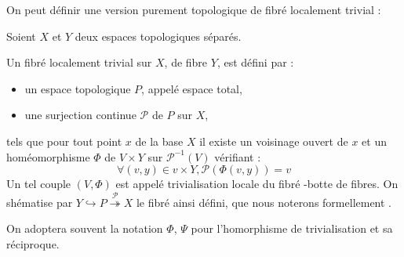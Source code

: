 On peut d\'efinir une version purement topologique de fibr\'e localement trivial :

\begin{defi}
Soient $X$ et $Y$ deux espaces topologiques s\'epar\'es.
\par
Un fibr\'e localement trivial sur $X$, de fibre $Y$, est d\'efini par :
\begin{itemize}
\item un espace topologique $P$, appel\'e espace total,%
\item une surjection continue $\mathcal{P}$ de $P$ sur $X$, %
\end{itemize}
tels que pour tout point $x$ de la base $X$ %
il existe un voisinage ouvert de $x$ et un hom\'eomorphisme $\Phi$ de $V\times Y$ sur $\mathcal{P}^{-1}(V)$ v\'erifiant :
\[\forall (v,y)\in v\times Y , \mathcal{P}(\Phi (v,y))=v\]
Un tel couple $(V, \Phi)$ est appel\'e trivialisation locale du fibr\'e -botte de fibres. %
On sh\'ematise par $Y \hookrightarrow P \overset{\mathcal{P}}{\twoheadrightarrow} X$ le fibr\'e ainsi d\'efini, %
que nous noterons formellement \Fiy.
\par
On adoptera souvent la notation $\Phi$, $\Psi$ pour l'homorphisme de trivialisation et sa r\'eciproque.
\end{defi}

